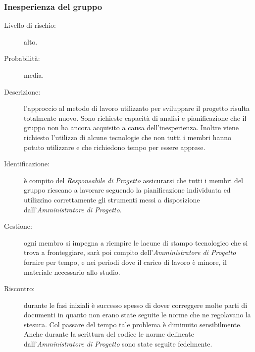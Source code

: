 \subsubsection{Inesperienza del gruppo}
\begin{description}
	\item[Livello di rischio:] alto.
	\item[Probabilità:] media.
	\item[Descrizione:] l'approccio al metodo di lavoro utilizzato per sviluppare il progetto risulta totalmente nuovo. Sono richieste capacità di analisi	e pianificazione che il gruppo non ha ancora acquisito a causa dell'inesperienza. Inoltre viene richiesto l'utilizzo di alcune tecnologie che non tutti i membri hanno potuto utilizzare e che richiedono tempo per essere apprese.
	\item[Identificazione:] è compito del \textit{Responsabile di Progetto} assicurarsi che tutti i membri del gruppo riescano a lavorare seguendo la pianificazione individuata ed utilizzino correttamente gli strumenti messi a disposizione dall'\textit{Amministratore di Progetto}.
	\item[Gestione:] ogni membro si impegna a riempire le lacune di stampo tecnologico che si trova a fronteggiare, sarà poi compito dell'\textit{Amministratore di Progetto} fornire per tempo, e nei periodi dove il carico di lavoro è minore, il materiale necessario allo studio.
	\item[Riscontro:] durante le fasi iniziali è successo spesso di dover correggere molte parti di documenti in quanto non erano state seguite le norme che ne regolavano la stesura. Col passare del tempo tale problema è diminuito sensibilmente. Anche durante la scrittura del codice le norme delineate dall'\textit{Amministratore di Progetto} sono state seguite fedelmente.
\end{description}

